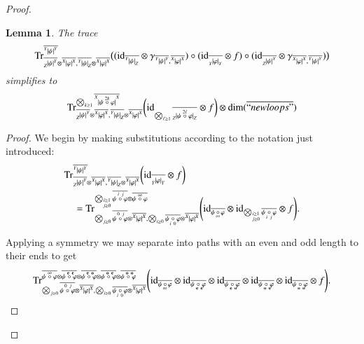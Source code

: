 \documentclass{amsart}
\def\tn{\textnormal}
\def\dim{\tn{dim}}
\def\Trace{\tn{Tr}}
\def\ol{\overline}
\def\id{\tn{id}}
\def\bfe{{\bf e}}
\def\bfo{{\bf o}}
\newcommand{\feeddd}[3]{{\tensor*[^{#2}_{\color{white}{!}}]{{|#1|}}{^{#3}}}}%
\newcommand{\feeddc}[3]{{\tensor*[^{#2}]{{|#1|}}{_{#3}}}}
\newcommand{\feedcd}[3]{{\tensor*[_{#2}]{{|#1|}}{^{#3}}}}
\newcommand{\feedcc}[3]{{\tensor*[^{\color{white}{!}}_{#2}]{{|#1|}}{_{#3}}}}
\newtheorem{lemma}[subsubsection]{Lemma}
\theoremstyle{remark}
\theoremstyle{definition}
\begin{document}
\begin{proof}
\begin{lemma}
 The trace
 \[\Trace^{\ol{\feeddd{\psi}{Y}{Y}}}_{\ol{\feedcd{\psi}{Z}{Y}}\otimes\ol{\feeddd{\varphi}{X}{X}},\ol{\feeddc{\psi}{Y}{Z}}\otimes\ol{\feeddd{\varphi}{X}{X}}}
\big(
(\id_{\ol{\feeddc{\psi}{Y}{Z}}}\otimes\gamma_{\ol{\feeddd{\psi}{Y}{Y}},\ol{\feeddd{\varphi}{X}{X}}})\circ(\id_{\ol{\feedcc{\varphi}{Y}{Y}}}\otimes f)\circ(\id_{\ol{\feedcd{\psi}{Z}{Y}}}\otimes\gamma_{\ol{\feeddd{\varphi}{X}{X}},\ol{\feeddd{\psi}{Y}{Y}}})
\big)\]
simplifies to
\[\Trace^{\bigotimes_{k\ge1}\ol{\feeddd{\psi\;\accentset{2k}{\circ}\;\varphi}{X}{X}}
}_{\ol{\feedcd{\psi}{Z}{Y}}\otimes\ol{\feeddd{\varphi}{X}{X}},\ol{\feeddc{\psi}{Y}{Z}}\otimes\ol{\feeddd{\varphi}{X}{X}}}
\bigg(
\id_{\bigotimes_{\ell\ge1}\ol{\feedcc{\psi\;\accentset{2\ell}{\circ}\;\varphi}{Z}{Z}}
}\otimes f
\bigg)\otimes\dim(\ol{``newloops"})\]
\end{lemma}
\begin{proof} 
 We begin by making substitutions according to the notation just introduced:
 \begin{align*}
  &\Trace^{\ol{\feeddd{\psi}{Y}{Y}}}_{\ol{\feedcd{\psi}{Z}{Y}}\otimes\ol{\feeddd{\varphi}{X}{X}},\ol{\feeddc{\psi}{Y}{Z}}\otimes\ol{\feeddd{\varphi}{X}{X}}}
\bigg(\id_{\ol{\feedcc{\varphi}{Y}{Y}}}\otimes f\bigg)\\
  &\quad=\Trace^{\bigotimes_{\substack{\scriptscriptstyle i\ge1\\ \scriptscriptstyle j\ge0}}\ol{\psi\;\accentset{\,i\ j}{\circ}\;\varphi}\otimes\ol{\psi\;\accentset{\infty}{\circ}\;\varphi}}_{\bigotimes_{j\ge0}\ol{\psi\;\accentset{\,0\ j}{\circ}\;\varphi}\otimes\ol{\feeddd{\varphi}{X}{X}},\bigotimes_{i\ge0}\ol{\psi\;\underaccent{\,i\ 0}{\circ}\;\varphi}\otimes\ol{\feeddd{\varphi}{X}{X}}}
\Bigg(\id_{\ol{\psi\,\underaccent{\,\infty}{\circ}\,\varphi}}\otimes\id_{\bigotimes_{\substack{\scriptscriptstyle i\ge1\\ \scriptscriptstyle j\ge0}}\ol{\psi\;\underaccent{\,i\ j}{\circ}\;\varphi}}\otimes f\Bigg).
\end{align*}

Applying a symmetry we may separate into paths with an even and odd length to their ends to get
 \begin{align*}
  \Trace^{\ol{\psi\;\accentset{\infty}{\circ}\;\varphi}\otimes\ol{\psi\;\accentset{\ \bfe\ \bfe}{\circ}\;\varphi}\otimes\ol{\psi\;\accentset{\ \bfe\ \bfo}{\circ}\;\varphi}\otimes\ol{\psi\;\accentset{\ \bfo\ \bfe}{\circ}\;\varphi}\otimes\ol{\psi\;\accentset{\ \bfo\ \bfo}{\circ}\;\varphi}}_{\bigotimes_{j\ge0}\ol{\psi\;\accentset{\,0\ j}{\circ}\;\varphi}\otimes\ol{\feeddd{\varphi}{X}{X}},\bigotimes_{i\ge0}\ol{\psi\;\underaccent{\,i\ 0}{\circ}\;\varphi}\otimes\ol{\feeddd{\varphi}{X}{X}}}
\Bigg(\id_{\ol{\psi\,\underaccent{\,\infty}{\circ}\,\varphi}}\otimes\id_{\ol{\psi\;\underaccent{\,\ \bfe\ \bfe}{\circ}\;\varphi}}\otimes\id_{\ol{\psi\;\underaccent{\,\ \bfe\ \bfo}{\circ}\;\varphi}}\otimes\id_{\ol{\psi\;\underaccent{\,\ \bfo\ \bfe}{\circ}\;\varphi}}\otimes\id_{\ol{\psi\;\underaccent{\,\ \bfo\ \bfo}{\circ}\;\varphi}}\otimes f\Bigg).
\end{align*}


\end{proof}
\end{proof}
\end{document}
